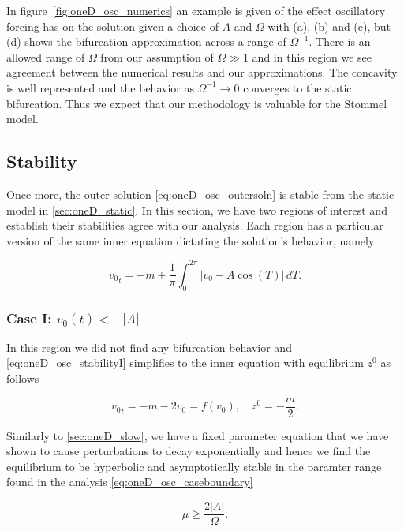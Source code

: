 \indent In figure~\ref{fig:oneD_osc_numerics} an example is given of the effect oscillatory forcing has on the solution given a choice of $A$ and $\Omega$ with (a), (b) and (c), but (d) shows the bifurcation approximation across a range of $\Omega^{-1}$. There is an allowed range of $\Omega$ from our assumption of $\Omega \gg 1$ and in this region we see agreement between the numerical results and our approximations. The concavity is well represented and the behavior as $\Omega^{-1}\to 0$ converges to the static bifurcation. Thus we expect that our methodology is valuable for the Stommel model.

\subsection{Stability}

Once more, the outer solution \eqref{eq:oneD_osc_outersoln} is stable from the static model in \autoref{sec:oneD_static}. In this section, we have two regions of interest and establish their stabilities agree with our analysis. Each region has a particular version of the same inner equation dictating the solution's behavior, namely

\begin{equation}\label{eq:oneD_osc_stabilityI}
{v_0}_t=-m+\frac{1}{\pi}\int_0^{2\pi}|v_0-A\cos(T)|\,dT.
\end{equation}

\subsubsection{Case I: $v_0(t)< -|A|$}

In this region we did not find any bifurcation behavior and \eqref{eq:oneD_osc_stabilityI} simplifies to the inner equation with equilibrium $z^0$ as follows

\begin{equation*}
{v_0}_t=-m-2v_0=f(v_0), \quad z^0=-\frac{m}{2}.
\end{equation*}

Similarly to \autoref{sec:oneD_slow}, we have a fixed parameter equation that we have shown to cause perturbations to decay exponentially and hence we find the equilibrium to be hyperbolic and asymptotically stable in the paramter range found in the analysis \eqref{eq:oneD_osc_caseboundary}

\begin{equation*}
\mu \ge \frac{2|A|}{\Omega}.
\end{equation*}

